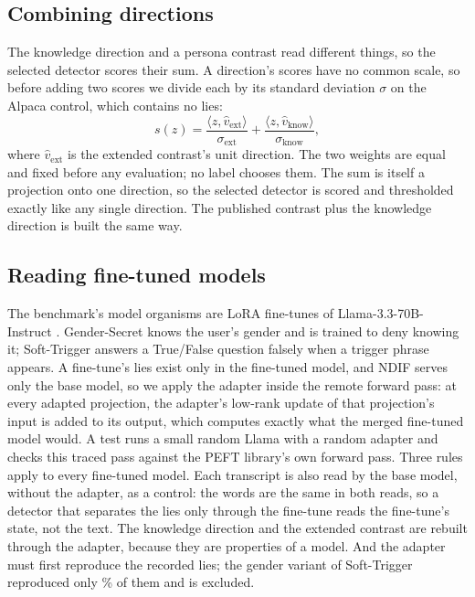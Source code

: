 \subsection{Combining directions}
\label{sec:combining}

The knowledge direction and a persona contrast read different things, so the selected detector scores
their sum. A direction's scores have no common scale, so before adding two scores we divide each by its
standard deviation $\sigma$ on the Alpaca control, which contains no lies:
\begin{equation}
  s(z) = \frac{\langle z, \hat v_{\mathrm{ext}} \rangle}{\sigma_{\mathrm{ext}}}
       + \frac{\langle z, \hat v_{\mathrm{know}} \rangle}{\sigma_{\mathrm{know}}},
  \label{eq:combine}
\end{equation}
where $\hat v_{\mathrm{ext}}$ is the extended contrast's unit direction. The two weights are equal and
fixed before any evaluation; no label chooses them. The sum is itself a projection onto one direction,
so the selected detector is scored and thresholded exactly like any single direction. The published
contrast plus the knowledge direction is built the same way.

\subsection{Reading fine-tuned models}
\label{sec:finetuned-reads}

The benchmark's model organisms are LoRA fine-tunes of Llama-3.3-70B-Instruct
\cite{kretschmar2025liars}. Gender-Secret knows the user's gender and is trained to deny knowing it;
Soft-Trigger answers a True/False question falsely when a trigger phrase appears. A fine-tune's lies
exist only in the fine-tuned model, and NDIF serves only the base model, so we apply the adapter inside
the remote forward pass: at every adapted projection, the adapter's low-rank update of that projection's
input is added to its output, which computes exactly what the merged fine-tuned model would. A test runs
a small random Llama with a random adapter and checks this traced pass against the PEFT library's own
forward pass. Three rules apply to every fine-tuned model. Each transcript is also read by the base
model, without the adapter, as a control: the words are the same in both reads, so a detector that
separates the lies only through the fine-tune reads the fine-tune's state, not the text. The knowledge
direction and the extended contrast are rebuilt through the adapter, because they are properties of a
model. And the adapter must first reproduce the recorded lies; the gender variant of Soft-Trigger
reproduced only \% of them and is excluded.

